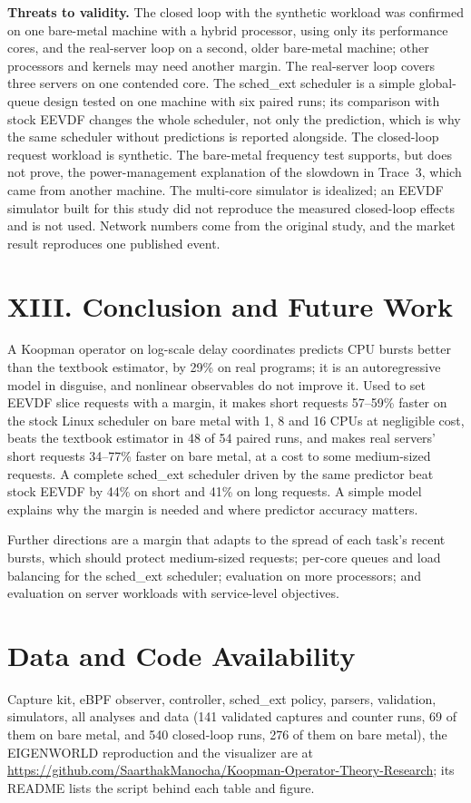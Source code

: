 \documentclass{article}
\begin{document}
\textbf{Threats to validity.} The closed loop with the synthetic workload was confirmed on one bare-metal machine with a hybrid processor, using only its performance cores, and the real-server loop on a second, older bare-metal machine; other processors and kernels may need another margin. The real-server loop covers three servers on one contended core. The sched\_ext scheduler is a simple global-queue design tested on one machine with six paired runs; its comparison with stock EEVDF changes the whole scheduler, not only the prediction, which is why the same scheduler without predictions is reported alongside. The closed-loop request workload is synthetic. The bare-metal frequency test supports, but does not prove, the power-management explanation of the slowdown in Trace~3, which came from another machine. The multi-core simulator is idealized; an EEVDF simulator built for this study did not reproduce the measured closed-loop effects and is not used. Network numbers come from the original study, and the market result reproduces one published event.

\section*{XIII. Conclusion and Future Work}
A Koopman operator on log-scale delay coordinates predicts CPU bursts better than the textbook estimator, by 29\% on real programs; it is an autoregressive model in disguise, and nonlinear observables do not improve it. Used to set EEVDF slice requests with a margin, it makes short requests 57--59\% faster on the stock Linux scheduler on bare metal with 1, 8 and 16 CPUs at negligible cost, beats the textbook estimator in 48 of 54 paired runs, and makes real servers' short requests 34--77\% faster on bare metal, at a cost to some medium-sized requests. A complete sched\_ext scheduler driven by the same predictor beat stock EEVDF by 44\% on short and 41\% on long requests. A simple model explains why the margin is needed and where predictor accuracy matters.

Further directions are a margin that adapts to the spread of each task's recent bursts, which should protect medium-sized requests; per-core queues and load balancing for the sched\_ext scheduler; evaluation on more processors; and evaluation on server workloads with service-level objectives.

\section*{Data and Code Availability}
Capture kit, eBPF observer, controller, sched\_ext policy, parsers, validation, simulators, all analyses and data (141 validated captures and counter runs, 69 of them on bare metal, and 540 closed-loop runs, 276 of them on bare metal), the EIGENWORLD reproduction and the visualizer are at \url{https://github.com/SaarthakManocha/Koopman-Operator-Theory-Research}; its README lists the script behind each table and figure.
\end{document}
